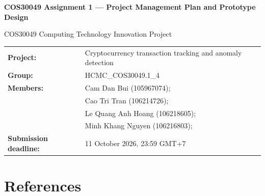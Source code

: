 \documentclass[a4paper,11pt]{article}
\begin{document}
\begin{titlepage}
  \centering
  \vspace*{3cm}
  {\LARGE\bfseries COS30049 Assignment 1 — Project Management Plan and Prototype Design\par}
  \vspace{1.5cm}
  {\large COS30049 Computing Technology Innovation Project\par}
  \vspace{1.5cm}
  \begin{tabular}{@{}ll@{}}
    \textbf{Project:} & Cryptocurrency transaction tracking and anomaly detection \\[4pt]
    \textbf{Group:}   & HCMC\_COS30049.1\_4 \\[4pt]
    \textbf{Members:} & Cam Dan Bui (105967074); \\
                      & Cao Tri Tran (106214726); \\
                      & Le Quang Anh Hoang (106218605); \\
                      & Minh Khang Nguyen (106216803); \\[4pt]
    \textbf{Submission deadline:} & 11 October 2026, 23:59 GMT+7 \\
  \end{tabular}
  \vfill
\end{titlepage}

\tableofcontents
\clearpage
\listoffigures
\listoftables
\clearpage
{}













\section*{References}
\end{document}
